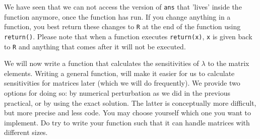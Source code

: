\documentclass{article}\usepackage[]{graphicx}\usepackage[]{color}
\begin{document}
\begin{mdframed}
We have seen that we can not access the version of \texttt{ans} that 'lives' inside the function anymore, once the function has run. If you change anything in a function, you best return these changes to \texttt{R} at the end of the function using \texttt{return()}. Please note that when a function executes \texttt{return(x)}, \texttt{x} is given back to \texttt{R} and anything that comes after it will not be executed.
\end{mdframed}

We will now write a function that calculates the sensitivities of $\lambda$ to the matrix elements. Writing a general function, will make it easier for us to calculate sensitivities for matrices later (which we will do frequently). We provide two options for doing so: by numerical perturbation as we did in the previous practical, or by using the exact solution. The latter is conceptually more difficult, but more precise and less code. You may choose yourself which one you want to implement. Do try to write your function such that it can handle matrices with different sizes.
\end{document}
